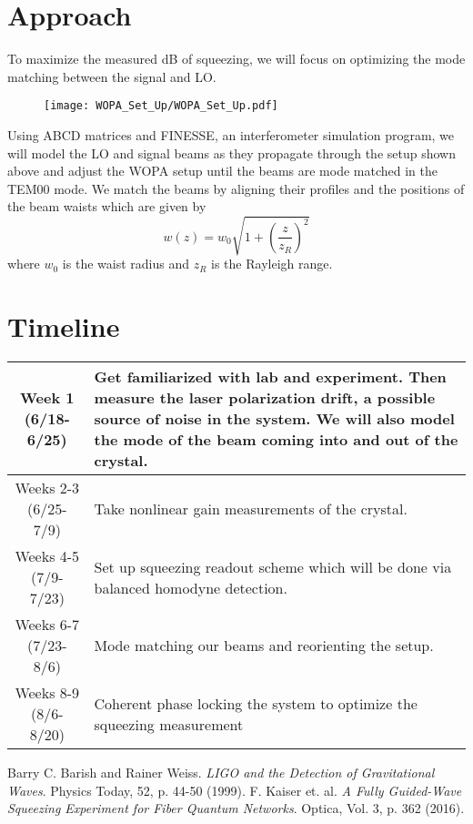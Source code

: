 \documentclass[colorlinks=true,pdfstartview=FitV,linkcolor=blue,
citecolor=red,urlcolor=magenta]{ligodoc}
\begin{document}
\section{Approach}
To maximize the measured dB of squeezing, we will focus on optimizing the mode matching between the signal and LO.
\begin{figure}
    \texttt{[image: WOPA\_Set\_Up/WOPA\_Set\_Up.pdf]}
\end{figure}
    Using ABCD matrices and FINESSE, an interferometer simulation program, we will model the LO and signal beams as they propagate through the setup shown above and adjust the WOPA setup until the beams are mode matched in the TEM00 mode. We match the beams by aligning their profiles and the positions of the beam waists which are given by
$$w(z)=w_0\sqrt{1+\left(\frac{z}{z_R}\right)^2}$$
where $w_0$ is the waist radius and $z_R$ is the Rayleigh range. 
\section{Timeline}
\begin{center}
\begin{tabular}{|c|m{13cm}|}
    \hline
    Week 1 (6/18-6/25) & Get familiarized with lab and experiment. Then measure the laser polarization drift, a possible source of noise in the system. We will also model the mode of the beam coming into and out of the crystal.\\
   \hline
    Weeks 2-3 (6/25-7/9) & Take nonlinear gain measurements of the crystal.\\
    \hline
    Weeks 4-5 (7/9-7/23) & Set up squeezing readout scheme which will be done via balanced homodyne detection. \\
    \hline
    Weeks 6-7 (7/23-8/6) & Mode matching our beams and reorienting the setup.\\
    \hline
    Weeks 8-9 (8/6-8/20) & Coherent phase locking the system to optimize the squeezing measurement\\
    \hline
\end{tabular}
\end{center}    
\begin{thebibliography}{9}
 Barry C. Barish and Rainer Weiss. \emph{LIGO and the Detection of Gravitational Waves}. Physics Today, 52, p. 44-50 (1999).
 F. Kaiser et. al. \emph{A Fully Guided-Wave Squeezing Experiment for Fiber Quantum Networks}. Optica, Vol. 3, p. 362 (2016).

\end{thebibliography}
\end{document}
